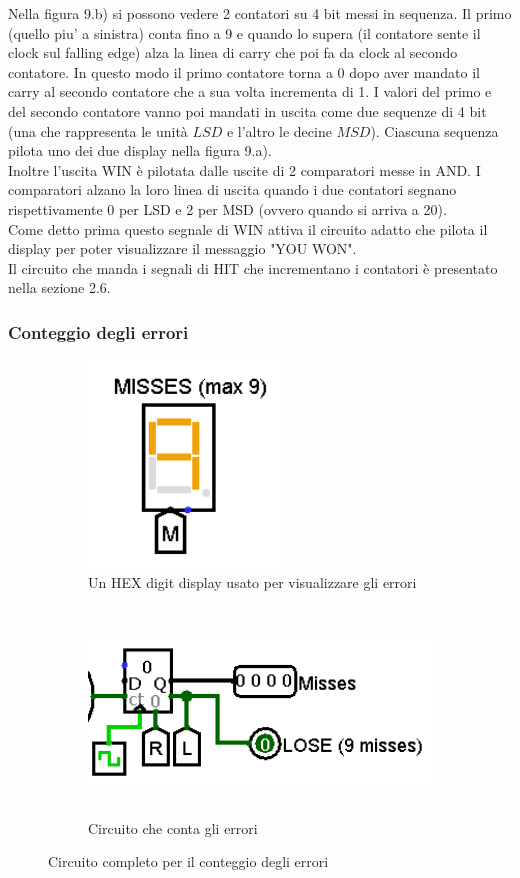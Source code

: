 \documentclass[11pt]{article}
\begin{document}
Nella figura 9.b) si possono vedere 2 contatori su 4 bit messi in sequenza.
Il primo (quello piu' a sinistra) conta fino a 9 e quando lo supera (il contatore 
sente il clock sul falling edge) alza la linea di carry che poi fa da clock al secondo contatore.
In questo modo il primo contatore torna a 0 dopo aver mandato il carry al secondo contatore
che a sua volta incrementa di 1.
I valori del primo e del secondo contatore vanno poi mandati in uscita come due sequenze
di 4 bit (una che rappresenta le unità $LSD$  e l'altro le decine $MSD$). Ciascuna sequenza
pilota uno dei due display nella figura 9.a).
\\Inoltre l'uscita WIN è pilotata dalle uscite di 2 comparatori messe in AND. I comparatori alzano la loro linea di uscita
quando i due contatori segnano rispettivamente 0 per LSD e 2 per MSD (ovvero quando si arriva a 20).
\\Come detto prima questo segnale di WIN attiva il circuito adatto che pilota il display per poter visualizzare
il messaggio "YOU WON".
\\Il circuito che manda i segnali di HIT che incrementano i contatori è presentato nella sezione 2.6.
\subsubsection{Conteggio degli errori}

\begin{figure}[h]
\begin{subfigure}{0.35\textwidth}
\includegraphics[width=1\linewidth, height=5.5cm]{immagini/hex_digit_display_miss} 
\caption{Un HEX digit display usato per visualizzare gli errori}
\label{fig:subfig3}
\end{subfigure}
\begin{subfigure}{0.6\textwidth}
\includegraphics[width=1.05\linewidth, height=5.5cm]{immagini/circuito_miss}
\caption{Circuito che conta gli errori}
\label{fig:subfig4}
\end{subfigure}
\caption{Circuito completo per il conteggio degli errori}
\label{fig:fig10}
\end{figure}
\end{document}
